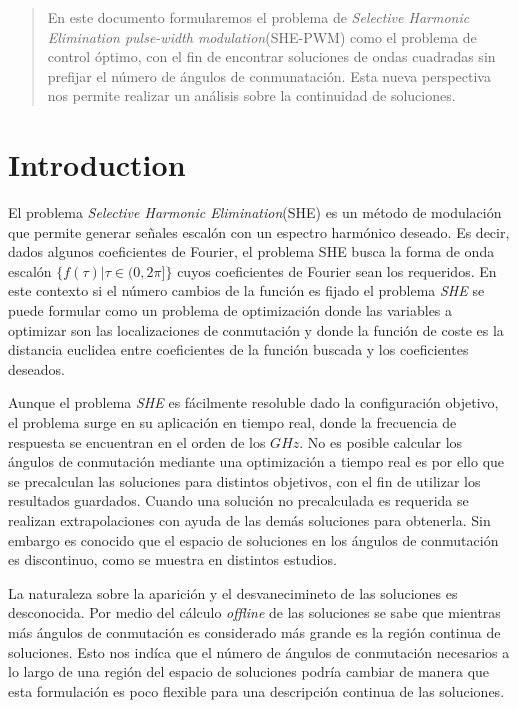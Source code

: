 
\begin{abstract}
    En este documento formularemos el problema de \emph{Selective Harmonic Elimination pulse-width modulation}(SHE-PWM) como el problema de control óptimo, con el fin de encontrar soluciones de ondas cuadradas sin prefijar el número de ángulos de conmunatación. Esta nueva perspectiva nos permite realizar un análisis sobre la continuidad de soluciones.
\end{abstract}

\section{Introduction} 

El problema \emph{Selective Harmonic Elimination}(SHE) \cite{Hoft1974} es un método de modulación que permite generar señales escalón con un espectro harmónico deseado. 
%
Es decir, dados algunos coeficientes de Fourier, el problema SHE busca la forma de onda escalón $\{f(\tau) | \tau \in (0,2\pi] \}$ cuyos coeficientes de Fourier sean los requeridos. 
%
En este contexto si el número cambios de la función es fijado el problema \emph{SHE} se puede formular como un problema de optimización donde las variables a optimizar son las localizaciones de conmutación y donde la función de coste es la distancia euclidea entre coeficientes de la función buscada y los coeficientes deseados. 

%
Aunque el problema \emph{SHE} es fácilmente resoluble dado la configuración objetivo, el problema surge en su aplicación en tiempo real, donde la frecuencia de respuesta se encuentran en el orden de los $GHz$. 
%
No es posible calcular los ángulos de conmutación mediante una optimización a tiempo real es por ello que se precalculan las soluciones para distintos objetivos, con el fin de utilizar los resultados guardados.
%
Cuando una solución no precalculada es requerida se realizan extrapolaciones con ayuda de las demás soluciones para obtenerla. 
%
Sin embargo es conocido que el espacio de soluciones en los ángulos de conmutación es discontinuo, como se muestra en distintos estudios.


%
La naturaleza sobre la aparición y el desvanecimineto de las soluciones es desconocida. Por medio del cálculo \emph{offline} de las soluciones se sabe que mientras más ángulos de conmutación es considerado más grande es la región continua de soluciones.
%
Esto nos indíca que el número de ángulos de conmutación necesarios a lo largo de una región del espacio de soluciones podría cambiar de manera que esta formulación es poco flexible para una descripción continua de las soluciones.

